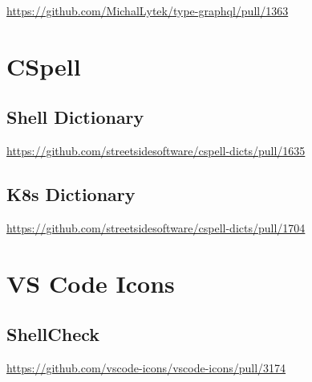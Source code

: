 \url{https://github.com/MichalLytek/type-graphql/pull/1363}

\section{CSpell}
\label{sec:contributions_cspell}

\subsection{Shell Dictionary}
\label{subsec:contributions_cspell_shell_dictionary}

\url{https://github.com/streetsidesoftware/cspell-dicts/pull/1635}

\subsection{K8s Dictionary}
\label{subsec:contributions_cspell_k8s_dictionary}

\url{https://github.com/streetsidesoftware/cspell-dicts/pull/1704}

\section{VS Code Icons}
\label{sec:contributions_vscode_icons}

\subsection{ShellCheck}
\label{subsec:contributions_vscode_icons_shellcheck}

\url{https://github.com/vscode-icons/vscode-icons/pull/3174}